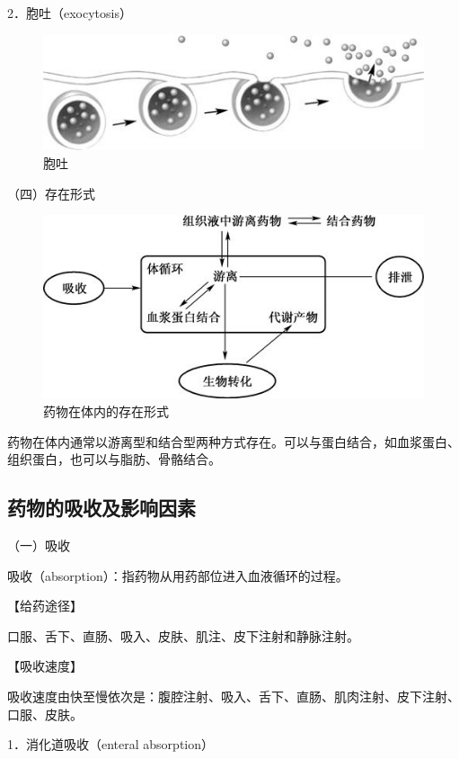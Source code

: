 2．胞吐（exocytosis）

\begin{figure}[!htbp]
 \centering
 \includegraphics{./images/Image00030.jpg}
 \captionsetup{justification=centering}
 \caption{胞吐}
 \label{fig3-4}
  \end{figure} 

（四）存在形式

\begin{figure}[!htbp]
 \centering
 \includegraphics{./images/Image00031.jpg}
 \captionsetup{justification=centering}
 \caption{药物在体内的存在形式}
 \label{fig3-5}
  \end{figure} 

药物在体内通常以游离型和结合型两种方式存在。可以与蛋白结合，如血浆蛋白、组织蛋白，也可以与脂肪、骨骼结合。

\subsection{药物的吸收及影响因素}

（一）吸收

吸收（absorption）：指药物从用药部位进入血液循环的过程。

【给药途径】

口服、舌下、直肠、吸入、皮肤、肌注、皮下注射和静脉注射。

【吸收速度】

吸收速度由快至慢依次是：腹腔注射、吸入、舌下、直肠、肌肉注射、皮下注射、口服、皮肤。

1．消化道吸收（enteral absorption）


